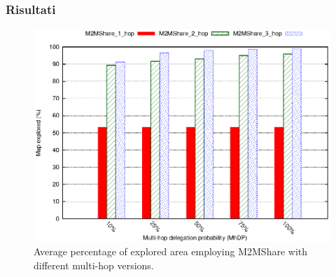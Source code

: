 \documentclass{beamer}
\begin{document}
\begin{frame}
\frametitle{Risultati}
\begin{center}
\begin{figure}[ht]
\includegraphics[scale=0.7]{../grafici/mapCovered_MultiHop.eps}
\caption{Average percentage of explored area employing M2MShare with different multi-hop versions.}
\end{figure}
\end{center}
\end{frame}
\end{document}
